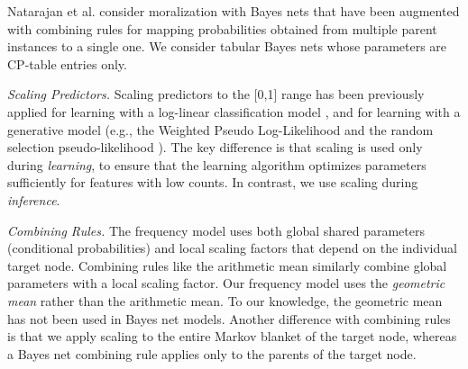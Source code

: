 \documentclass[twoside,leqno,twocolumn]{article}
\begin{document}
Natarajan et al. \cite{Natarajan2010} consider moralization with Bayes nets that have been augmented with combining rules for mapping probabilities obtained from multiple parent instances to a single one.
We consider tabular Bayes nets whose parameters are CP-table entries only. 

{\em Scaling Predictors.} Scaling predictors to the [0,1] range has been previously applied for learning with a log-linear classification model \cite{Raina2003}, and for learning with a generative model (e.g., the Weighted Pseudo Log-Likelihood \cite{Domingos2007} and the random selection pseudo-likelihood \cite{Schulte2011}). 
The key difference is that scaling is used only during {\em learning}, to ensure that the learning algorithm optimizes parameters sufficiently for features with low counts. In contrast, we use scaling during {\em inference}. 

{\em Combining Rules.} The frequency model uses both global shared parameters (conditional probabilities) and local scaling factors that depend on the individual target node. Combining rules like the arithmetic mean \cite{Natarajan2010} similarly combine global parameters with a local scaling factor. Our frequency model uses the {\em geometric mean} rather than the arithmetic mean. To our knowledge, the geometric mean has not been used in Bayes net models. Another difference with combining rules is that we apply scaling to the entire Markov blanket of the target node, whereas a Bayes net combining rule applies only to the parents of the target node.
\end{document}
